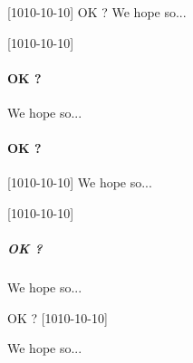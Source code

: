 \documentclass[10pt, a4paper, theme = dark]{../main/main}
\begin{document}
[1010-10-10]
OK ?
We hope so...

\vspace{2cm}


[1010-10-10]
\paragraph{OK ?}
We hope so...

\vspace{2cm}


\paragraph{OK ?}
[1010-10-10]
We hope so...

\vspace{2cm}


[1010-10-10]
\subparagraph{OK ?}
We hope so...


OK ?
[1010-10-10]
\par
We hope so...
\end{document}

